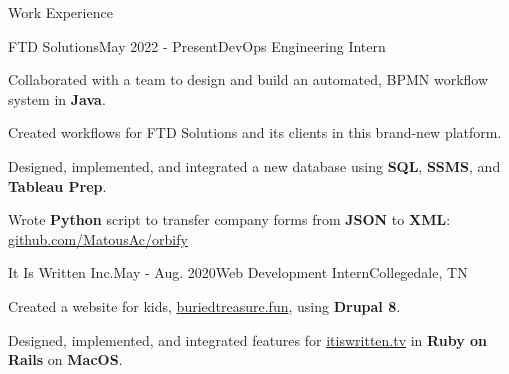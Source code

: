 \begin{rSection}{Work Experience}
  \begin{job}{FTD Solutions}{May 2022 - Present}{DevOps Engineering Intern}{}
    \item Collaborated with a team to design and build an automated, BPMN workflow system in {\bf Java}.
    \item Created workflows for FTD Solutions and its clients in this brand-new platform.
    \item Designed, implemented, and integrated a new database using {\bf SQL}, {\bf SSMS}, and {\bf Tableau Prep}.
    \item Wrote {\bf Python} script to transfer company forms from {\bf JSON} to {\bf XML}: \href{https://github.com/MatousAc/orbify}{github.com/MatousAc/orbify}
  \end{job}



  \begin{job}{It Is Written Inc.}{May - Aug. 2020}{Web Development Intern}{Collegedale, TN}
    \item Created a website for kids, \href{https://buriedtreasure.fun/}{buriedtreasure.fun}, using {\bf Drupal 8}.
    \item Designed, implemented, and integrated features for \href{https://itiswritten.tv}{itiswritten.tv} in {\bf Ruby on Rails} on {\bf MacOS}.
  \end{job}
\end{rSection}
